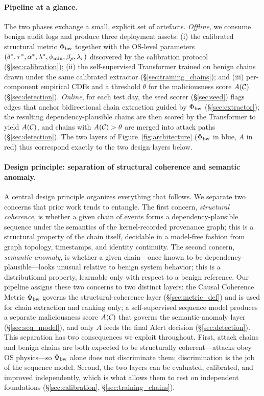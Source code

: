 \paragraph{Pipeline at a glance.} The two phases exchange a small, explicit set of artefacts. \emph{Offline}, we consume benign audit logs and produce three deployment assets: (i) the calibrated structural metric $\Phi_{\text{bw}}$ together with the OS-level parameters $(\delta^*, \tau^*, \alpha^*, \lambda^*, \phi_{\min}, \beta_p, \lambda_r)$ discovered by the calibration protocol (\S\ref{sec:calibration}); (ii) the self-supervised Transformer trained on benign chains drawn under the same calibrated extractor (\S\ref{sec:training_chains}); and (iii) per-component empirical CDFs and a threshold $\theta$ for the maliciousness score $A(\mathcal{C})$ (\S\ref{sec:detection}). \emph{Online}, for each test day, the seed scorer (\S\ref{sec:seed}) flags edges that anchor bidirectional chain extraction guided by $\Phi_{\text{bw}}$ (\S\ref{sec:extractor}); the resulting dependency-plausible chains are then scored by the Transformer to yield $A(\mathcal{C})$, and chains with $A(\mathcal{C}) > \theta$ are merged into attack paths (\S\ref{sec:detection}). The two layers of Figure~\ref{fig:architecture} ($\Phi_{\text{bw}}$ in blue, $A$ in red) thus correspond exactly to the two design layers below.

\paragraph{Design principle: separation of structural coherence and semantic anomaly.} A central design principle organizes everything that follows. We separate two concerns that prior work tends to entangle. The first concern, \emph{structural coherence}, is whether a given chain of events forms a dependency-plausible sequence under the semantics of the kernel-recorded provenance graph; this is a structural property of the chain itself, decidable in a model-free fashion from graph topology, timestamps, and identity continuity. The second concern, \emph{semantic anomaly}, is whether a given chain---once known to be dependency-plausible---looks unusual relative to benign system behavior; this is a distributional property, learnable only with respect to a benign reference. Our pipeline assigns these two concerns to two distinct layers: the Causal Coherence Metric $\Phi_{\text{bw}}$ governs the structural-coherence layer (\S\ref{sec:metric_def}) and is used for chain extraction and ranking only; a self-supervised sequence model produces a separate maliciousness score $A(\mathcal{C})$ that governs the semantic-anomaly layer (\S\ref{sec:seq_model}), and only $A$ feeds the final $\text{Alert}$ decision (\S\ref{sec:detection}). This separation has two consequences we exploit throughout. First, attack chains and benign chains are both expected to be structurally coherent---attacks obey OS physics---so $\Phi_{\text{bw}}$ alone does not discriminate them; discrimination is the job of the sequence model. Second, the two layers can be evaluated, calibrated, and improved independently, which is what allows them to rest on independent foundations (\S\ref{sec:calibration}, \S\ref{sec:training_chains}).

